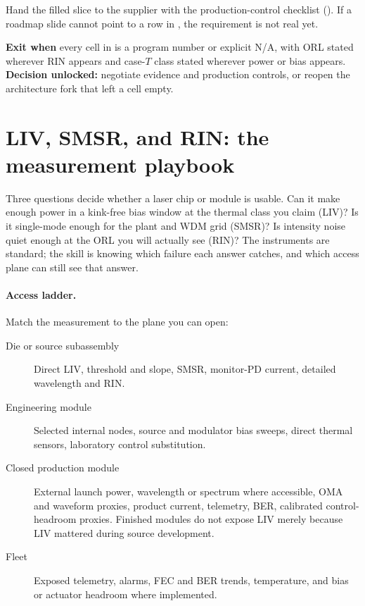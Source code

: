 Hand the filled slice to the supplier with the production-control checklist
(). If a roadmap slide cannot point to a
row in , the requirement is not real yet.

\textbf{Exit when} every cell in  is a program number or
explicit N/A, with ORL stated wherever RIN appears and case-$T$ class stated
wherever power or bias appears. \textbf{Decision unlocked:} negotiate evidence
and production controls, or reopen the architecture fork that left a cell empty.


\section{LIV, SMSR, and RIN: the measurement playbook}
\label{sec:laser-params}

Three questions decide whether a laser chip or module is usable. Can it make
enough power in a kink-free bias window at the thermal class you claim (LIV)?
Is it single-mode enough for the plant and WDM grid (SMSR)? Is intensity noise
quiet enough at the ORL you will actually see (RIN)? The instruments are
standard; the skill is knowing which failure each answer catches, and which
access plane can still see that answer.

\paragraph{Access ladder.}
Match the measurement to the plane you can open:
\begin{description}
\item[Die or source subassembly] Direct LIV, threshold and slope, SMSR,
      monitor-PD current, detailed wavelength and RIN.
\item[Engineering module] Selected internal nodes, source and modulator bias
      sweeps, direct thermal sensors, laboratory control substitution.
\item[Closed production module] External launch power, wavelength or spectrum
      where accessible, OMA and waveform proxies, product current, telemetry,
      BER, calibrated control-headroom proxies. Finished modules do not expose
      LIV merely because LIV mattered during source development.
\item[Fleet] Exposed telemetry, alarms, FEC and BER trends, temperature, and
      bias or actuator headroom where implemented.
\end{description}

